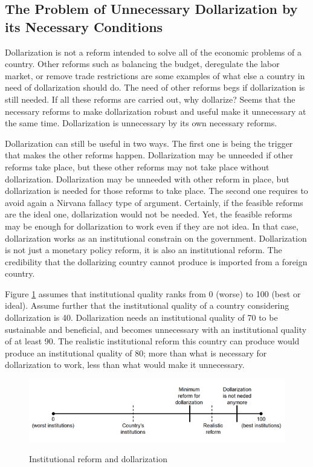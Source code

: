 \documentclass[12pt]{article}
\begin{document}
\subsection{The Problem of Unnecessary Dollarization by its Necessary Conditions}

Dollarization is not a reform intended to solve all of the economic problems of a country. Other reforms such as balancing the budget, deregulate the labor market, or remove trade restrictions are some examples of what else a country in need of dollarization should do. The need of other reforms begs if dollarization is still needed. If all these reforms are carried out, why dollarize? Seems that the necessary reforms to make dollarization robust and useful make it unnecessary at the same time. Dollarization is unnecessary by its own necessary reforms.

Dollarization can still be useful in two ways. The first one is being the trigger that makes the other reforms happen. Dollarization may be unneeded if other reforms take place, but these other reforms may not take place without dollarization. Dollarization may be unneeded with other reform in place, but dollarization is needed for those reforms to take place. The second one requires to avoid again a Nirvana fallacy type of argument. Certainly, if the feasible reforms are the ideal one, dollarization would not be needed. Yet, the feasible reforms may be enough for dollarization to work even if they are not idea. In that case, dollarization works as an institutional constrain on the government. Dollarization is not just a monetary policy reform, it is also an institutional reform. The credibility that the dollarizing country cannot produce is imported from a foreign country. 

Figure \ref{fig:Fig01} assumes that institutional quality ranks from 0 (worse) to 100 (best or ideal). Assume further that the institutional quality of a country considering dollarization is 40. Dollarization needs an institutional quality of 70 to be sustainable and beneficial, and becomes unnecessary with an institutional quality of at least 90. The realistic institutional reform this country can produce would produce an institutional quality of 80; more than what is necessary for dollarization to work, less than what would make it unnecessary.

\begin{figure}[h]
    \caption{Institutional reform and dollarization}
    \centering
    \includegraphics{Fig_01.png}
    \label{fig:Fig01}
\end{figure}
\end{document}
